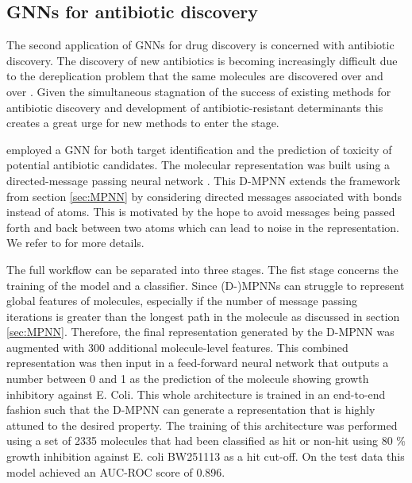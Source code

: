 \subsection{GNNs for antibiotic discovery}
The second application of GNNs for drug discovery is concerned with antibiotic discovery. The discovery of new antibiotics is becoming increasingly difficult due to the dereplication problem that the same molecules are discovered over and over \citep{COX201798}. Given the simultaneous stagnation of the success of existing methods for antibiotic discovery and development of antibiotic-resistant determinants this creates a great urge for new methods to enter the stage.  

\cite{STOKES2020688} employed a GNN for both target identification and the prediction of toxicity of potential antibiotic candidates. The molecular representation was built using a directed-message passing neural network \cite{yangMPP}. This D-MPNN extends the framework from section \ref{sec:MPNN} by considering directed messages associated with bonds instead of atoms. This is motivated by the hope to avoid messages being passed forth and back between two atoms which can lead to noise in the representation. We refer to \cite{yangMPP} for more details.

The full workflow can be separated into three stages. The fist stage concerns the training of the model and a classifier.
Since (D-)MPNNs can struggle to represent global features of molecules, especially if the number of message passing iterations is greater than the longest path in the molecule as discussed in section \ref{sec:MPNN}. Therefore, the final representation generated by the D-MPNN was augmented with 300 additional molecule-level features. This combined representation was then input in a feed-forward neural network that outputs a number between 0 and 1 as the prediction of the molecule showing growth inhibitory against E. Coli. This whole architecture is trained in an end-to-end fashion such that the D-MPNN can generate a representation that is highly attuned to the desired property.
The training of this architecture was performed using a set of 2335 molecules that had been classified as hit or non-hit using 80 \% growth inhibition against E. coli BW251113 \cite{ZAMPIERI20171214} as a hit cut-off. On the test data this model achieved an AUC-ROC score of 0.896.

